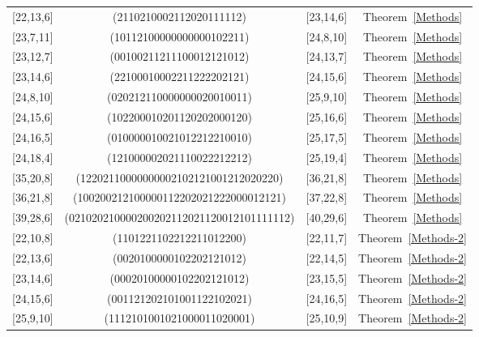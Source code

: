 \documentclass[12pt,twoside]{article}
\theoremstyle{plain}
\theoremstyle{definition}
\theoremstyle{remark}
\begin{document}
{\begin{center}
\begin{threeparttable}
\begin{tabular}{cccc}
[22,13,6] &    (2110210002112020111112) & [23,14,6] & {\rm Theorem}\ \ref{Methods} \\

[23,7,11] &    (10112100000000000102211) & [24,8,10] & {\rm Theorem}\ \ref{Methods} \\

[23,12,7] &     (00100211211100012121012) & [24,13,7] & {\rm Theorem}\ \ref{Methods} \\

[23,14,6] &     (22100010002211222202121) & [24,15,6] & {\rm Theorem}\ \ref{Methods} \\

[24,8,10] &     (020212110000000020010011) & [25,9,10] & {\rm Theorem}\ \ref{Methods} \\

[24,15,6] &    (102200010201120202000120) & [25,16,6] & {\rm Theorem}\ \ref{Methods} \\

[24,16,5] &    (010000010021012212210010) & [25,17,5] & {\rm Theorem}\ \ref{Methods} \\

[24,18,4] &    (121000002021110022212212) & [25,19,4] & {\rm Theorem}\ \ref{Methods} \\

[35,20,8] &       (12202110000000002102121001212020220) & [36,21,8] & {\rm Theorem}\ \ref{Methods} \\

[36,21,8] &        (100200212100000112202021222000012121) & [37,22,8] & {\rm Theorem}\ \ref{Methods} \\

[39,28,6] &         (021020210000200202112021120012101111112) & [40,29,6] & {\rm Theorem}\ \ref{Methods} \\

[22,10,8] &     (1101221102212211012200) & [22,11,7] & {\rm Theorem}\ \ref{Methods-2} \\

[22,13,6] &      (0020100000102202121012) & [22,14,5] & {\rm Theorem}\ \ref{Methods-2} \\

[23,14,6] &  (00020100000102202121012) & [23,15,5] & {\rm Theorem}\ \ref{Methods-2} \\

[24,15,6] &  (001121202101001122102021) & [24,16,5] & {\rm Theorem}\ \ref{Methods-2} \\

[25,9,10] &  (1112101001021000011020001) & [25,10,9] & {\rm Theorem}\ \ref{Methods-2}\\


\end{tabular}
\end{threeparttable}
\end{center}}
\end{document}
